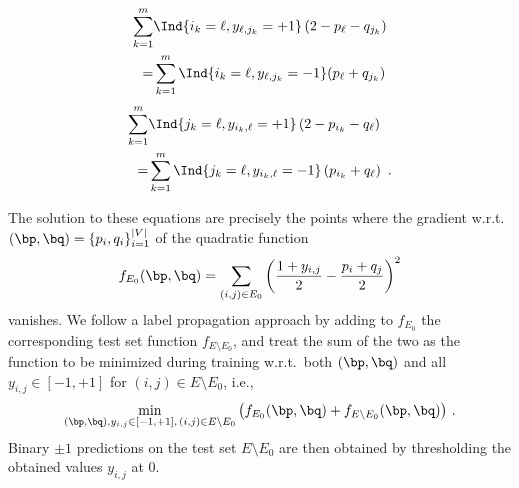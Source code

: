 %
\begin{align*}
\sum_{k=1}^m &\Ind{i_k = \ell,y_{\ell,j_k}=+1} \left(2-p_{\ell}-q_{j_k}\right)\\
=
&\sum_{k=1}^m \Ind{i_k = \ell,y_{\ell,j_k}=-1}
(p_{\ell}+q_{j_k})%
\end{align*}
%
%
\begin{align*}
\sum_{k=1}^m &\Ind{j_k = \ell,y_{i_k,\ell}=+1} \left(2-p_{i_k}-q_{\ell}\right)\\
=
&\sum_{k=1}^m  \Ind{j_k = \ell,y_{i_k,\ell}=-1}
\left(p_{i_k}+q_{\ell}\right)~.%
\end{align*}
%
%
%
\iffalse
************************************
Denoting for brevity ${\wh \dout(i)}$ and  ${\wh \din(i)}$ the out-degre and the in-degree 
of node $i$ over the training set, these can be rewritten as
% 
\begin{align*}
\sum_{k=1\,:\,i_k = \ell}^m \left(p_{\ell}+q_{j_k}\right) 
&= 
{\wh \dout(\ell)} + \sum_{k=1\,:\,i_k = \ell} y_{\ell,j_k}, \qquad \ell = 1, \ldots, |V|~,\\
\sum_{k=1\,:\,j_k = \ell}^m \left(p_{i_k}+q_{\ell}\right) 
&= 
{\wh \din(\ell)} + \sum_{k=1\,:\,j_k = \ell} y_{i_k,\ell}, \qquad \ell = 1, \ldots, |V|\,,
\end{align*}
%
************************************
\fi
The solution to these equations are precisely the points where the gradient w.r.t.\ $(\bp,\bq) =\{p_i, q_i\}_{i=1}^{|V|}$ of the quadratic function
\[
f_{E_0}(\bp,\bq) = \sum_{(i,j) \in E_0} \left(\frac{1+y_{i,j}}{2} - \frac{p_i+q_j}{2} \right)^2
\]
vanishes.
We follow a label propagation approach by adding to $f_{E_0}$ the corresponding test set function $f_{E\setminus E_0}$, and treat the sum of the two as the function to be minimized during training w.r.t.\ both $(\bp,\bq)$ and all $y_{i,j} \in [-1,+1]$ for $(i,j)\in E\setminus E_0$, i.e.,
%
\begin{equation}\label{e:quadratic}
\min_{(\bp,\bq), y_{i,j} \in [-1,+1],\,(i,j)\in E\setminus E_0} 
\left(f_{E_0}(\bp,\bq) + f_{E\setminus E_0}(\bp,\bq)\right)\,.
\end{equation}
%
Binary $\pm 1$ predictions on the test set $E\setminus E_0$ are then obtained by thresholding the obtained values $y_{i,j}$ at $0$.


